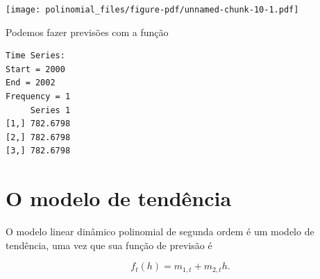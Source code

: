 \documentclass[
  letterpaper,
  DIV=11,
  numbers=noendperiod]{scrreprt}
\newenvironment{Shaded}{\begin{snugshade}}{\end{snugshade}}
\newcommand{\AttributeTok}[1]{\textcolor[rgb]{0.40,0.45,0.13}{#1}}
\newcommand{\CommentTok}[1]{\textcolor[rgb]{0.37,0.37,0.37}{#1}}
\newcommand{\DecValTok}[1]{\textcolor[rgb]{0.68,0.00,0.00}{#1}}
\newcommand{\FloatTok}[1]{\textcolor[rgb]{0.68,0.00,0.00}{#1}}
\newcommand{\FunctionTok}[1]{\textcolor[rgb]{0.28,0.35,0.67}{#1}}
\newcommand{\NormalTok}[1]{\textcolor[rgb]{0.00,0.23,0.31}{#1}}
\newcommand{\OtherTok}[1]{\textcolor[rgb]{0.00,0.23,0.31}{#1}}
\newcommand{\SpecialCharTok}[1]{\textcolor[rgb]{0.37,0.37,0.37}{#1}}
\newcommand{\StringTok}[1]{\textcolor[rgb]{0.13,0.47,0.30}{#1}}
\begin{document}
\begin{Shaded}
\end{Shaded}

\texttt{[image: polinomial\_files/figure-pdf/unnamed-chunk-10-1.pdf]}

Podemos fazer previsões com a função

\begin{Shaded}
\end{Shaded}

\begin{verbatim}
Time Series:
Start = 2000 
End = 2002 
Frequency = 1 
     Series 1
[1,] 782.6798
[2,] 782.6798
[3,] 782.6798
\end{verbatim}

\section{O modelo de tendência}\label{o-modelo-de-tenduxeancia}

O modelo linear dinâmico polinomial de segunda ordem é um modelo de
tendência, uma vez que sua função de previsão é

\[f_t(h)=m_{1,t}+m_{2,t}h.\]
\end{document}
